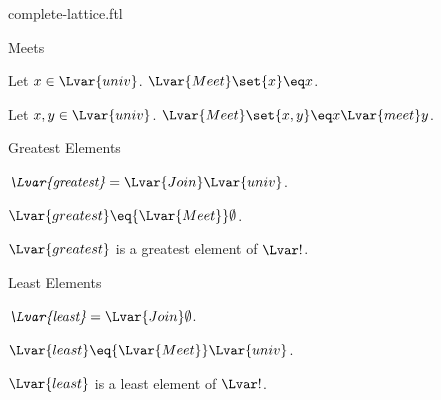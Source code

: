 \documentclass{naproche-library}
\begin{document}
\begin{smodule}[title=Complete Lattices]{complete-lattice.ftl}
\begin{sfragment}{Meets}
  \begin{proposition}[forthel,id=MeetOfSingletonThm]
    Let $x\in\Lvar{univ}$.
    ${\Lvar{Meet}}\set{x}\eq x$.
  \end{proposition}

  \begin{proposition}[forthel,id=MeetOfPairThm]
    Let $x,y\in\Lvar{univ}$.
    ${\Lvar{Meet}}\set{x,y}\eq x{\Lvar{meet}}y$.
  \end{proposition}
\end{sfragment}

\begin{sfragment}{Greatest Elements}
  \begin{definition}[forthel,id=CompleteLatticeGreatestDef]
    $\emph{{\Lvar{greatest}}}={\Lvar{Join}}\Lvar{univ}$.
  \end{definition}

  \begin{proposition}[forthel,id=GreatestIsMeetOfEmptystThm]
    ${\Lvar{greatest}}\eq{\Lvar{Meet}}\emptyset$.
  \end{proposition}

  \begin{proposition}[forthel,id=GreatestIsGreatestElement]
    ${\Lvar{greatest}}$ is a greatest element of $\Lvar!$.
  \end{proposition}
\end{sfragment}

\begin{sfragment}{Least Elements}
  \begin{definition}[forthel,id=CompleteLatticeLeastDef]
    $\emph{{\Lvar{least}}}={\Lvar{Join}}\emptyset$.
  \end{definition}

  \begin{proposition}[forthel,id=GreatestIsMeetOfUniverseThm]
    ${\Lvar{least}}\eq{\Lvar{Meet}}\Lvar{univ}$.
  \end{proposition}

  \begin{proposition}[forthel,id=LeastIsLeastElementThm]
    ${\Lvar{least}}$ is a least element of $\Lvar!$.
  \end{proposition}
\end{sfragment}
\end{smodule}
\end{document}
